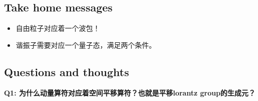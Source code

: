 \subsection{Take home messages}
\begin{itemize}
  \item 自由粒子对应着一个波包！
  \item 谐振子需要对应一个量子态，满足两个条件。
\end{itemize}

\subsection{Questions and thoughts}
\textbf{Q1: 为什么动量算符对应着空间平移算符？也就是平移lorantz group的生成元？}



